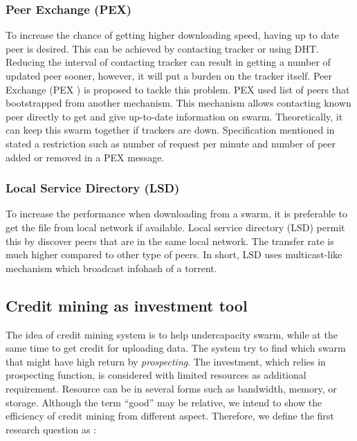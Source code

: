 \subsubsection{Peer Exchange (PEX)}
To increase the chance of getting higher downloading speed, having up to date peer is desired. This can be achieved by contacting tracker or using DHT. Reducing the interval of contacting tracker can result in getting a number of updated peer sooner, however, it will put a burden on the tracker itself. Peer Exchange (PEX )\cite{2015:PEX:the8472} is proposed to tackle this problem. PEX used list of peers that bootstrapped from another mechanism. This mechanism allows contacting known peer directly to get and give up-to-date information on swarm. Theoretically, it can keep this swarm together if trackers are down. Specification mentioned in \cite{2015:PEX:the8472} stated a restriction such as number of request per minute and number of peer added or removed in a PEX message.

\subsubsection{Local Service Directory (LSD)}
To increase the performance when downloading from a swarm, it is preferable to get the file from local network if available. Local service directory (LSD) permit this by discover peers that are in the same local network. The transfer rate is much higher compared to other type of peers. In short, LSD uses multicast-like mechanism which broadcast infohash of a torrent.

\subsection{Credit mining as investment tool}

The idea of credit mining system is to help undercapacity swarm, while at the same time to get credit for uploading data. The system try to find which swarm that might have high return by \textit{prospecting}. The investment, which relies in prospecting function, is considered with limited resources as additional requirement. Resource can be in several forms such as bandwidth, memory, or storage. Although the term ``good'' may be relative, we intend to show the efficiency of credit mining from different aspect. Therefore, we define the first research question as :

	
